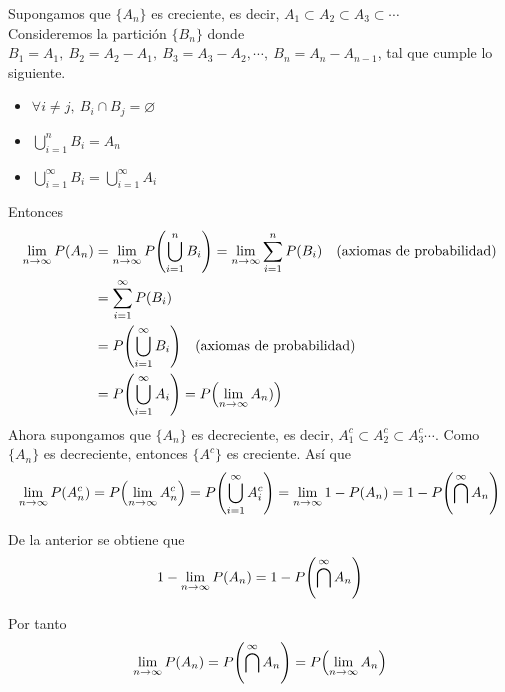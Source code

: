 \begin{myproof}
  Supongamos que $\{A_n\}$ es creciente, es decir, $A_1 \subset A_2 \subset A_3 \subset \cdots$\\
  Consideremos la partición $\{B_n\}$ donde $B_1 = A_1,~ B_2 = A_2 - A_1, ~ B_3 = A_3 - A_2, \cdots,~ B_n = A_n - A_{n-1}$, tal que cumple lo siguiente.
  \begin{itemize}
    \item $\forall i \neq j,~ B_i \cap B_j = \varnothing$
    \item $\bigcup_{i = 1}^n B_i = A_n$
    \item $\bigcup_{i = 1}^{\infty} B_i = \bigcup_{i = 1}^{\infty} A_i$
  \end{itemize}

  Entonces
  \begin{align*}
    \lim_{n \to \infty} P(A_n) &= \lim_{n \to \infty} P\parens*{\bigcup_{i = 1}^n B_i} = \lim_{n \to \infty} \sum_{i = 1}^n P(B_i) \quad \text{(axiomas de probabilidad)}\\
                               &= \sum_{i = 1}^{\infty} P(B_i)\\
                               &= P\parens*{\bigcup_{i = 1}^{\infty}B_i}
                               \quad \text{(axiomas de probabilidad)}\\ 
                               &= P\parens*{\bigcup_{i = 1}^{\infty}A_i}= P\parens*{\lim_{n \to \infty} A_n)}
  \end{align*}
  Ahora supongamos que $\{A_n\}$ es decreciente, es decir, $A_1^c \subset A_2^c \subset A_3^c \cdots$. Como $\{A_n\}$ es decreciente, entonces $\{A^c\}$ es creciente. Así que
  \begin{align*}
    \lim_{n \to \infty} P(A_n^c) &= P\parens*{\lim_{n \to \infty}A_n^c} = P\parens*{\bigcup_{i = 1}^{\infty}A_i^c} = \lim_{n \to \infty} 1 - P(A_n) = 1 - P\parens*{\bigcap^{\infty}A_n}\\
  \end{align*}

  De la anterior se obtiene que 
  \[1 - \lim_{n \to \infty} P(A_n) = 1 - P\parens*{\bigcap^{\infty}A_n}\]

  Por tanto
  \[\lim_{n \to \infty}P(A_n) = P\parens*{\bigcap^{\infty}A_n} = P\parens*{\lim_{n \to \infty}A_n}\]
\end{myproof}
